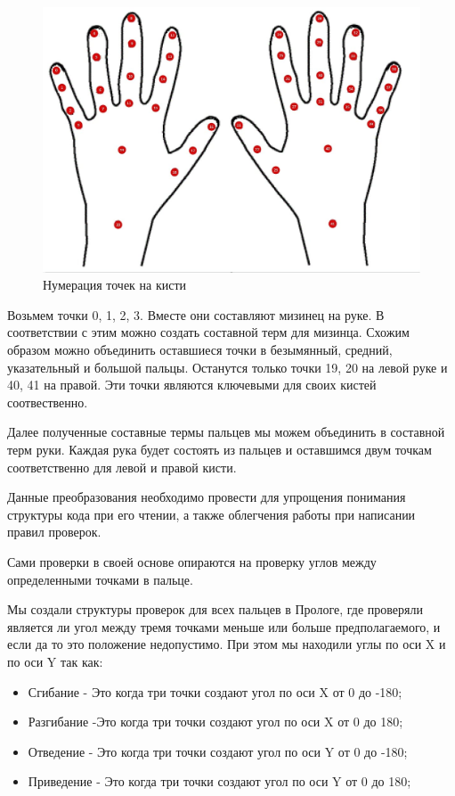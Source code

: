 \begin{figure}[ht!]
	\centering
	\includegraphics[scale=0.5]{Kist.jpg}
	\caption{Нумерация точек на кисти}
	\label{fig:hands}
\end{figure}

\hspace{0.6cm} Возьмем точки 0, 1, 2, 3. Вместе они составляют мизинец на руке. В соответствии с этим можно создать составной терм для мизинца. Схожим образом можно объединить оставшиеся точки в безымянный, средний, указательный и большой пальцы. Останутся только точки 19, 20 на левой руке и 40, 41 на правой. Эти точки являются ключевыми для своих кистей соотвественно.

\hspace{0.6cm} Далее полученные составные термы пальцев мы можем объединить в составной терм руки. Каждая рука будет состоять из пальцев и оставшимся двум точкам соответственно для левой и правой кисти.

\hspace{0.6cm} Данные преобразования необходимо провести для упрощения понимания структуры кода при его чтении, а также облегчения работы при написании правил проверок.

\hspace{0.6cm} Сами проверки в своей основе опираются на проверку углов между определенными точками в пальце.  

\hspace{0.6cm} Мы создали структуры проверок для всех пальцев в Прологе, где проверяли является ли угол между тремя точками меньше или больше предполагаемого, и если да то это положение недопустимо. При этом мы находили углы по оси X и по оси Y так как:
\begin{itemize}
	\item Сгибание - Это когда три точки создают угол по оси X от 0 до -180;
	\item Разгибание -Это когда три точки создают угол по оси X от 0 до 180;
	\item Отведение - Это когда три точки создают угол по оси Y от 0 до -180;
	\item Приведение - Это когда три точки создают угол по оси Y от 0 до 180;
\end{itemize}

